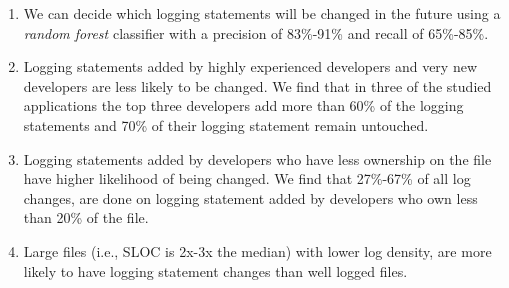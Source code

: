 \begin{enumerate}
	\item We can decide which logging statements will be changed in the future using a \emph{random forest} classifier with a precision of 83\%-91\% and recall of 65\%-85\%.


	\item Logging statements added  by highly experienced developers and very new developers are less likely to be changed. We find that in three of the studied applications the top three developers add more than 60\% of the logging statements and 70\% of their logging statement remain untouched. 
	
	
	\item Logging statements added by developers who have less ownership on the file have higher likelihood of being changed. We find that
	27\%-67\% of all log changes, are done on logging statement added by developers who own less than 20\% of the file.
	
	
	
	\item Large files (i.e., SLOC is 2x-3x the median) with lower log density, are more likely to have logging statement changes than well logged files.


\end{enumerate}


